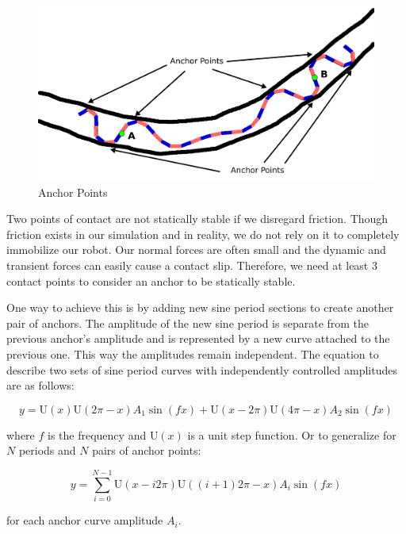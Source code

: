 \begin{figure}[htbp]
\centering
\includegraphics[keepaspectratio,width=400pt,height=0.75\textheight]{ref_points_pose2.png}
\caption{Anchor Points}
\label{fig:anchor_points}
\end{figure}




Two points of contact are not statically stable if we disregard friction. Though friction exists in our simulation and in reality, we do not rely on it to completely immobilize our robot. Our normal forces are often small and the dynamic and transient forces can easily cause a contact slip. Therefore, we need at least 3 contact points to consider an anchor to be statically stable.

One way to achieve this is by adding new sine period sections to create another pair of anchors. The amplitude of the new sine period is separate from the previous anchor's amplitude and is represented by a new curve attached to the previous one. This way the amplitudes remain independent. The equation to describe two sets of sine period curves with independently controlled amplitudes are as follows:


\begin{equation}
y = \mathrm{U}(x)  \mathrm{U}(2\pi-x) A_1 \sin(fx) + \mathrm{U}(x-2\pi) \mathrm{U}(4\pi-x) A_2 \sin(fx)
\end{equation}


where $f$ is the frequency and $\mathrm{U}(x)$ is a unit step function. Or to generalize for $N$ periods and $N$ pairs of anchor points:


\begin{equation}
y = \sum_{i=0}^{N-1} \mathrm{U}(x-i 2\pi) \mathrm{U}((i+1) 2\pi-x) A_i \sin(fx)
\end{equation}


for each anchor curve amplitude $A_i$.


